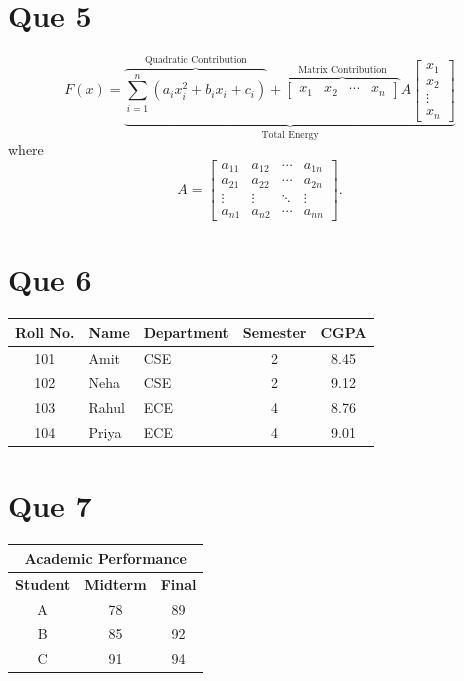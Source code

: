 \documentclass[12pt,a4paper]{article}
\begin{document}
	\section*{Que 5}
	\[
	F(x)=
	\underbrace{
		\overbrace{\sum_{i=1}^{n}\left(a_i x_i^{2}+b_i x_i+c_i\right)}^{\text{Quadratic Contribution}}
		+
		\overbrace{\begin{bmatrix} x_1 & x_2 & \cdots & x_n \end{bmatrix}}^{\text{Matrix Contribution}}
		A
		\begin{bmatrix} x_1\\ x_2\\ \vdots\\ x_n \end{bmatrix}
	}_{\text{Total Energy}}
	\]
	where
	\[
	A=
	\begin{bmatrix}
		a_{11} & a_{12} & \cdots & a_{1n}\\
		a_{21} & a_{22} & \cdots & a_{2n}\\
		\vdots & \vdots & \ddots & \vdots\\
		a_{n1} & a_{n2} & \cdots & a_{nn}
	\end{bmatrix}.
	\]
	
	\section*{Que 6}
	\begin{center}
		\begin{tabular}{|c|l|l|c|c|}
			\hline
			\textbf{Roll No.} & \textbf{Name} & \textbf{Department} & \textbf{Semester} & \textbf{CGPA} \\
			\hline
			101 & Amit  & CSE & 2 & 8.45 \\
			\hline
			102 & Neha  & CSE & 2 & 9.12 \\
			\hline
			103 & Rahul & ECE & 4 & 8.76 \\
			\hline
			104 & Priya & ECE & 4 & 9.01 \\
			\hline
		\end{tabular}
	\end{center}
	
	\section*{Que 7}
	\begin{center}
		\begin{tabular}{|c|c|c|}
			\hline
			\multicolumn{3}{|c|}{\textbf{Academic Performance}} \\
			\hline
			\textbf{Student} & \textbf{Midterm} & \textbf{Final} \\
			\hline
			A & 78 & 89 \\
			B & 85 & 92 \\
			C & 91 & 94 \\
			\hline
		\end{tabular}
	\end{center}
	
\end{document}
